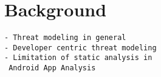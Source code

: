 
\section{Background}

\begin{verbatim}
- Threat modeling in general
- Developer centric threat modeling
- Limitation of static analysis in
 Android App Analysis
\end{verbatim}
